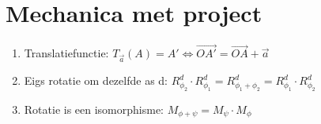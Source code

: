 \documentclass[12pt]{article}
\begin{document}
    \maketitle

	\section{Mechanica met project}%
	\label{sec:Mechanica_met_project}

	\begin{enumerate}
		\item Translatiefunctie: $ T_{\vec{a}}(A) = A' \iff \vec{OA'} = \vec{OA} + \vec{a} $
		\item Eigs rotatie om dezelfde as d: $ R_{\phi_2}^d \cdot R_{\phi_1}^d = R_{\phi_1 + \phi_2}^d = R_{\phi_1}^d \cdot R_{\phi_2}^d $
	\item Rotatie is een isomorphisme: $ M_{\phi + \psi} = M_{\psi} \cdot M_{\phi} $
	\end{enumerate}
	
\end{document}
